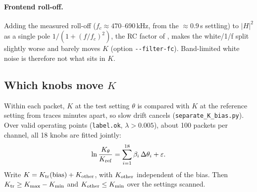 \documentclass[10pt,a4paper]{article}
\newcommand{\code}[1]{\texttt{\small #1}}
\begin{document}
\paragraph{Frontend roll-off.} Adding the measured roll-off ($f_c\approx470$--690\,kHz, from the $\approx$0.9\,\textmu s
settling) to $|H|^2$ as a single pole $1/(1+(f/f_c)^2)$, the RC factor of \cite{hopkinson1982}, makes the white/1/f split
slightly worse and barely moves $K$ (option \code{-{}-filter-fc}). Band-limited white noise is therefore not what sits
in $K$.

\subsection{Which knobs move $K$}\label{sec:Kbias}
Within each packet, $K$ at the test setting $\theta$ is compared with $K$ at the reference setting from traces minutes
apart, so slow drift cancels (\code{separate\_K\_bias.py}). Over valid operating points (\code{label.ok},
$\lambda>0.005$), about 100 packets per channel, all 18 knobs are fitted jointly:
\begin{equation}
\ln\frac{K_\theta}{K_{\rm ref}}=\sum_{i=1}^{18}\beta_i\,\Delta\theta_i+\varepsilon .
\end{equation}
Write $K=K_{\rm tr}(\text{bias})+K_{\rm other}$, with $K_{\rm other}$ independent of the bias. Then
$K_{\rm tr}\ge K_{\max}-K_{\min}$ and $K_{\rm other}\le K_{\min}$ over the settings scanned.
\end{document}
